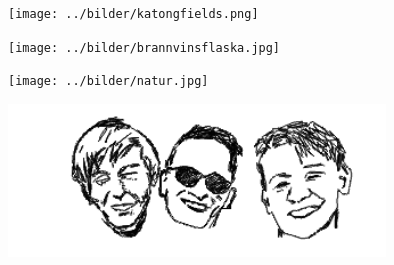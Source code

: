 %



\sclearpage

\begin{intersong}
	\begin{center}
		\vspace{20mm}
		\texttt{[image: ../bilder/katongfields.png]} 
	\end{center}
\end{intersong}

\sclearpage

\begin{intersong}
\begin{center}
\texttt{[image: ../bilder/brannvinsflaska.jpg]} 
\end{center}
\end{intersong}
\sclearpage




\begin{intersong}
\begin{center}
\texttt{[image: ../bilder/natur.jpg]} 
\end{center}
\end{intersong}
\sclearpage

\sclearpage

\begin{intersong}
	\begin{center}
		\includegraphics[width=0.75\textwidth]{../bilder/fardigabilder/CamillasFardigaBilder/humorgruppenKAJ.png} 
	\end{center}
\end{intersong}

\sclearpage

%